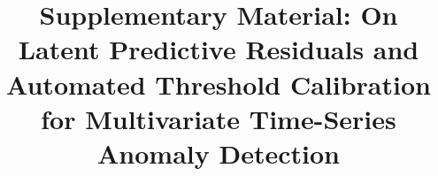 \documentclass[journal]{IEEEtran}
\begin{document}
\title{Supplementary Material: On Latent Predictive Residuals and Automated Threshold Calibration for Multivariate Time-Series Anomaly Detection}
\maketitle











\onecolumn

\twocolumn

\def\IEEEbibitemsep{0.5pt plus 0.5pt}


\end{document}
